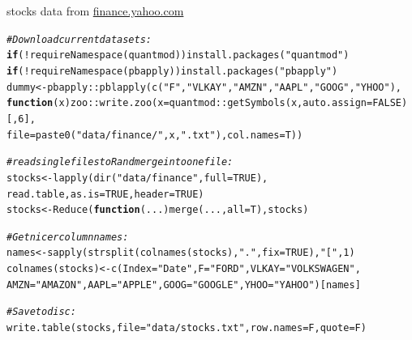 \documentclass[xcolor=table,           xcolor=dvipsnames]{beamer}\usepackage[]{graphicx}\usepackage[]{color}
\makeatletter
\newcommand{\hlnum}[1]{\textcolor[rgb]{0,0,0}{#1}}
\newcommand{\hlstr}[1]{\textcolor[rgb]{0.545,0.137,0.137}{#1}}
\newcommand{\hlcom}[1]{\textcolor[rgb]{0,0.392,0}{\textit{#1}}}
\newcommand{\hlopt}[1]{\textcolor[rgb]{0,0,0}{#1}}
\newcommand{\hlstd}[1]{\textcolor[rgb]{0,0,0}{#1}}
\newcommand{\hlkwa}[1]{\textcolor[rgb]{1,0,0}{\textbf{#1}}}
\newcommand{\hlkwb}[1]{\textcolor[rgb]{0,0,0}{#1}}
\newcommand{\hlkwc}[1]{\textcolor[rgb]{1,0,1}{#1}}
\newcommand{\hlkwd}[1]{\textcolor[rgb]{0,0,1}{#1}}
\newenvironment{kframe}{%
 \def\at@end@of@kframe{}%
 \ifinner\ifhmode%
  \def\at@end@of@kframe{\end{minipage}}%
  \begin{minipage}{\columnwidth}%
 \fi\fi%
 \def\FrameCommand##1{\hskip\@totalleftmargin \hskip-\fboxsep
 \colorbox{shadecolor}{##1}\hskip-\fboxsep
     \hskip-\linewidth \hskip-\@totalleftmargin \hskip\columnwidth}%
 \MakeFramed {\advance\hsize-\width
   \@totalleftmargin\z@ \linewidth\hsize
   \@setminipage}}%
 {\par\unskip\endMakeFramed%
 \at@end@of@kframe}
\newenvironment{knitrout}{}{} %
\makeatother
\begin{document}
\begin{frame}[fragile]{stocks data from \href{http://finance.yahoo.com}{finance.yahoo.com}}
\begin{knitrout}\scriptsize
{}\color{fgcolor}\begin{kframe}
\begin{alltt}
\hlcom{# Download current datasets:}
\hlkwa{if}\hlstd{(}\hlopt{!}\hlkwd{requireNamespace}\hlstd{(quantmod))} \hlkwd{install.packages}\hlstd{(}\hlstr{"quantmod"}\hlstd{)}
\hlkwa{if}\hlstd{(}\hlopt{!}\hlkwd{requireNamespace}\hlstd{(pbapply))}  \hlkwd{install.packages}\hlstd{(}\hlstr{"pbapply"}\hlstd{)}
\hlstd{dummy} \hlkwb{<-} \hlstd{pbapply}\hlopt{::}\hlkwd{pblapply}\hlstd{(}\hlkwd{c}\hlstd{(}\hlstr{"F"}\hlstd{,}\hlstr{"VLKAY"}\hlstd{,} \hlstr{"AMZN"}\hlstd{,}\hlstr{"AAPL"}\hlstd{,}\hlstr{"GOOG"}\hlstd{,}\hlstr{"YHOO"}\hlstd{),}
   \hlkwa{function}\hlstd{(}\hlkwc{x}\hlstd{) zoo}\hlopt{::}\hlkwd{write.zoo}\hlstd{(}\hlkwc{x}\hlstd{=quantmod}\hlopt{::}\hlkwd{getSymbols}\hlstd{(x,} \hlkwc{auto.assign}\hlstd{=}\hlnum{FALSE}\hlstd{)[,}\hlnum{6}\hlstd{],}
                           \hlkwc{file}\hlstd{=}\hlkwd{paste0}\hlstd{(}\hlstr{"data/finance/"}\hlstd{,x,}\hlstr{".txt"}\hlstd{),} \hlkwc{col.names}\hlstd{=T))}

\hlcom{# read single files to R and merge into one file:}
\hlstd{stocks} \hlkwb{<-} \hlkwd{lapply}\hlstd{(}\hlkwd{dir}\hlstd{(}\hlstr{"data/finance"}\hlstd{,} \hlkwc{full}\hlstd{=}\hlnum{TRUE}\hlstd{),}
                  \hlstd{read.table,} \hlkwc{as.is}\hlstd{=}\hlnum{TRUE}\hlstd{,} \hlkwc{header}\hlstd{=}\hlnum{TRUE}\hlstd{)}
\hlstd{stocks} \hlkwb{<-} \hlkwd{Reduce}\hlstd{(}\hlkwa{function}\hlstd{(}\hlkwc{...}\hlstd{)} \hlkwd{merge}\hlstd{(...,} \hlkwc{all}\hlstd{=T), stocks)}

\hlcom{# Get nicer column names:}
\hlstd{names} \hlkwb{<-} \hlkwd{sapply}\hlstd{(}\hlkwd{strsplit}\hlstd{(}\hlkwd{colnames}\hlstd{(stocks),} \hlstr{"."}\hlstd{,} \hlkwc{fix}\hlstd{=}\hlnum{TRUE}\hlstd{),}\hlstr{"["}\hlstd{,} \hlnum{1}\hlstd{)}
\hlkwd{colnames}\hlstd{(stocks)} \hlkwb{<-} \hlkwd{c}\hlstd{(}\hlkwc{Index}\hlstd{=}\hlstr{"Date"}\hlstd{,} \hlkwc{F}\hlstd{=}\hlstr{"FORD"}\hlstd{,} \hlkwc{VLKAY}\hlstd{=}\hlstr{"VOLKSWAGEN"}\hlstd{,}
              \hlkwc{AMZN}\hlstd{=}\hlstr{"AMAZON"}\hlstd{,} \hlkwc{AAPL}\hlstd{=}\hlstr{"APPLE"}\hlstd{,} \hlkwc{GOOG}\hlstd{=}\hlstr{"GOOGLE"}\hlstd{,} \hlkwc{YHOO}\hlstd{=}\hlstr{"YAHOO"}\hlstd{)[names]}

\hlcom{# Save to disc:}
\hlkwd{write.table}\hlstd{(stocks,} \hlkwc{file}\hlstd{=}\hlstr{"data/stocks.txt"}\hlstd{,} \hlkwc{row.names}\hlstd{=F,} \hlkwc{quote}\hlstd{=F)}
\end{alltt}
\end{kframe}
\end{knitrout}
\end{frame}
\end{document}
